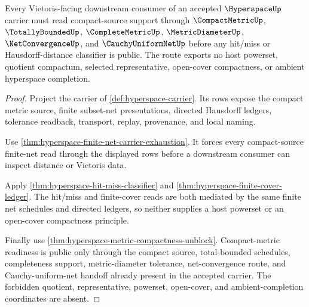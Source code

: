 \begin{theorem}
\label{thm:hyperspace-compactmetric-vietoris-unblock}
Every Vietoris-facing downstream consumer of an accepted $\HyperspaceUp$ carrier must read compact-source support through $\CompactMetricUp$, $\TotallyBoundedUp$, $\CompleteMetricUp$, $\MetricDiameterUp$, $\NetConvergenceUp$, and $\CauchyUniformNetUp$ before any hit/miss or Hausdorff-distance classifier is public. The route exports no host powerset, quotient compactum, selected representative, open-cover compactness, or ambient hyperspace completion.
\end{theorem}
\begin{proof}
Project the carrier of \autoref{def:hyperspace-carrier}. Its rows expose the compact metric source, finite subset-net presentations, directed Hausdorff ledgers, tolerance readback, transport, replay, provenance, and local naming.

Use \autoref{thm:hyperspace-finite-net-carrier-exhaustion}. It forces every compact-source finite-net read through the displayed rows before a downstream consumer can inspect distance or Vietoris data.

Apply \autoref{thm:hyperspace-hit-miss-classifier} and \autoref{thm:hyperspace-finite-cover-ledger}. The hit/miss and finite-cover reads are both mediated by the same finite net schedules and directed ledgers, so neither supplies a host powerset or an open-cover compactness principle.

Finally use \autoref{thm:hyperspace-metric-compactness-unblock}. Compact-metric readiness is public only through the compact source, total-bounded schedules, completeness support, metric-diameter tolerance, net-convergence route, and Cauchy-uniform-net handoff already present in the accepted carrier. The forbidden quotient, representative, powerset, open-cover, and ambient-completion coordinates are absent.
\end{proof}

